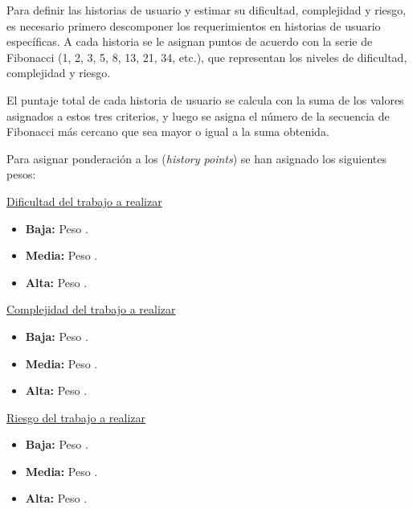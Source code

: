 Para definir las historias de usuario y estimar su dificultad, complejidad y riesgo, es necesario primero descomponer los requerimientos en historias de
usuario específicas. A cada historia se le asignan puntos de acuerdo con la serie de Fibonacci (1, 2, 3, 5, 8, 13, 21, 34, etc.), que representan los niveles
de dificultad, complejidad y riesgo.

El puntaje total de cada historia de usuario se calcula con la suma de los valores asignados a estos tres criterios, y luego se asigna el número de la
secuencia de Fibonacci más cercano que sea mayor o igual a la suma obtenida. 

Para asignar ponderación a los (\textit{history points}) se han asignado los
siguientes pesos:

\underline{Dificultad del trabajo a realizar}
\begin{itemize}
	\item \textbf{Baja:} Peso .
	\item \textbf{Media:} Peso .
	\item \textbf{Alta:} Peso .
\end{itemize}

\underline{Complejidad del trabajo a realizar}
\begin{itemize}
	\item \textbf{Baja:} Peso .
	\item \textbf{Media:} Peso .
	\item \textbf{Alta:} Peso .
\end{itemize}

\underline{Riesgo del trabajo a realizar}
\begin{itemize}
	\item \textbf{Baja:} Peso .
	\item \textbf{Media:} Peso .
	\item \textbf{Alta:} Peso .
\end{itemize}

\pagebreak

